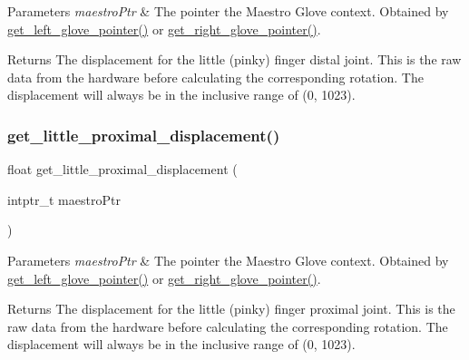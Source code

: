 \begin{DoxyParams}{Parameters}
{\em maestro\+Ptr} & The pointer the Maestro Glove context. Obtained by \hyperlink{group__glove_management_ga63ce3c99d4a8b8db851b22af9185764e}{get\+\_\+left\+\_\+glove\+\_\+pointer()} or \hyperlink{group__glove_management_ga9b8fd9d91aeac3f8da50f7a7eba0c32b}{get\+\_\+right\+\_\+glove\+\_\+pointer()}. \\
\hline
\end{DoxyParams}
\begin{DoxyReturn}{Returns}
The displacement for the little (pinky) finger distal joint. This is the raw data from the hardware before calculating the corresponding rotation. The displacement will always be in the inclusive range of (0, 1023). 
\end{DoxyReturn}
\mbox{\label{group__displacement_access_ga010054a4a8e649390d426732de2e8792}} 
\subsubsection{\texorpdfstring{get\+\_\+little\+\_\+proximal\+\_\+displacement()}{get\_little\_proximal\_displacement()}}
{\footnotesize\ttfamily float get\+\_\+little\+\_\+proximal\+\_\+displacement (\begin{DoxyParamCaption}\item[{intptr\+\_\+t}]{maestro\+Ptr }\end{DoxyParamCaption})}


\begin{DoxyParams}{Parameters}
{\em maestro\+Ptr} & The pointer the Maestro Glove context. Obtained by \hyperlink{group__glove_management_ga63ce3c99d4a8b8db851b22af9185764e}{get\+\_\+left\+\_\+glove\+\_\+pointer()} or \hyperlink{group__glove_management_ga9b8fd9d91aeac3f8da50f7a7eba0c32b}{get\+\_\+right\+\_\+glove\+\_\+pointer()}. \\
\hline
\end{DoxyParams}
\begin{DoxyReturn}{Returns}
The displacement for the little (pinky) finger proximal joint. This is the raw data from the hardware before calculating the corresponding rotation. The displacement will always be in the inclusive range of (0, 1023). 
\end{DoxyReturn}
\mbox{\label{group__displacement_access_gaca7b0c2eacb336f7214292cfc7d4098f}} 
